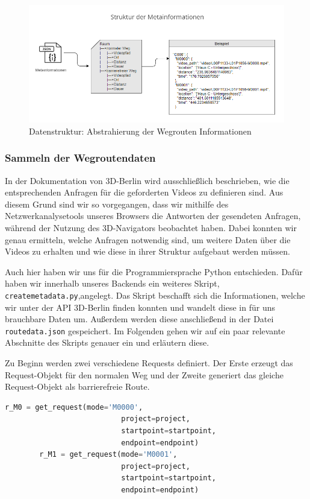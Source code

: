 \begin{figure}[H]
    \includegraphics[width=\textwidth]{Figures/3DNavigator/Metadatenstruktur_Raumfinder.png}
    \caption{Datenstruktur: Abstrahierung der Wegrouten Informationen}
    \label{fig:json-bild}
    \centering
\end{figure}

\subsubsection{Sammeln der Wegroutendaten}
\label{sec:jsonget}
In der Dokumentation von 3D-Berlin wird ausschließlich beschrieben, wie die entsprechenden Anfragen für die geforderten Videos zu definieren sind. Aus diesem Grund sind wir so vorgegangen, dass wir mithilfe des Netzwerkanalysetools unseres Browsers die Antworten der gesendeten Anfragen, während der Nutzung des 3D-Navigators beobachtet haben. Dabei konnten wir genau ermitteln, welche Anfragen notwendig sind, um weitere Daten über die Videos zu erhalten und wie diese in ihrer Struktur aufgebaut werden müssen.

Auch hier haben wir uns für die Programmiersprache Python entschieden. Dafür haben wir innerhalb unseres Backends ein weiteres Skript, \verb|createmetadata.py|,angelegt. Das Skript beschafft sich die Informationen, welche wir unter der API 3D-Berlin finden konnten und wandelt diese in für uns brauchbare Daten um. Außerdem werden diese anschließend in der Datei \verb|routedata.json| gespeichert. Im Folgenden gehen wir auf ein paar relevante Abschnitte des Skripts genauer ein und erläutern diese.

Zu Beginn werden zwei verschiedene Requests definiert. Der Erste erzeugt das Request-Objekt für den normalen Weg und der Zweite generiert das gleiche Request-Objekt als barrierefreie Route.

\begin{lstlisting}[language=Python, caption={Definieren der Anfragen}]
        r_M0 = get_request(mode='M0000',
                           project=project,
                           startpoint=startpoint,
                           endpoint=endpoint)
        r_M1 = get_request(mode='M0001', 
                           project=project, 
                           startpoint=startpoint, 
                           endpoint=endpoint)

\end{lstlisting}

